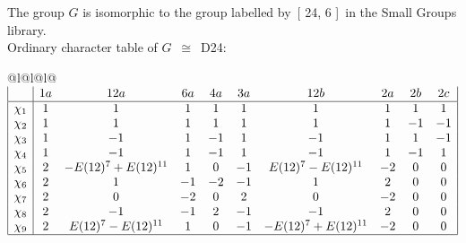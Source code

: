 \documentclass[varwidth=\maxdimen,border=10]{standalone}
\begin{document}
The group $G$ is isomorphic to the group labelled by\ [ 24, 6 ]\ in the Small Groups library.\\
Ordinary character table of $G$\ $\cong$\ D24:\\
\begin{center}
\begin{tabular}{@{}l@{}l@{}l@{}}
\hline
\(\begin{array}{|l|ccccccccc|}
  & 1a & 12a & 6a & 4a & 3a & 12b & 2a & 2b & 2c\\ \hline
\chi_{1} & 1 & 1 & 1 & 1 & 1 & 1 & 1 & 1 & 1\\
\chi_{2} & 1 & 1 & 1 & 1 & 1 & 1 & 1 & -1 & -1\\
\chi_{3} & 1 & -1 & 1 & -1 & 1 & -1 & 1 & 1 & -1\\
\chi_{4} & 1 & -1 & 1 & -1 & 1 & -1 & 1 & -1 & 1\\
\chi_{5} & 2 & -E(12)^{7}+E(12)^{11} & 1 & 0 & -1 & E(12)^{7}-E(12)^{11} & -2 & 0 & 0\\
\chi_{6} & 2 & 1 & -1 & -2 & -1 & 1 & 2 & 0 & 0\\
\chi_{7} & 2 & 0 & -2 & 0 & 2 & 0 & -2 & 0 & 0\\
\chi_{8} & 2 & -1 & -1 & 2 & -1 & -1 & 2 & 0 & 0\\
\chi_{9} & 2 & E(12)^{7}-E(12)^{11} & 1 & 0 & -1 & -E(12)^{7}+E(12)^{11} & -2 & 0 & 0\\
\hline
\end{array}\)\\
\end{tabular}
\end{center}
\end{document}
